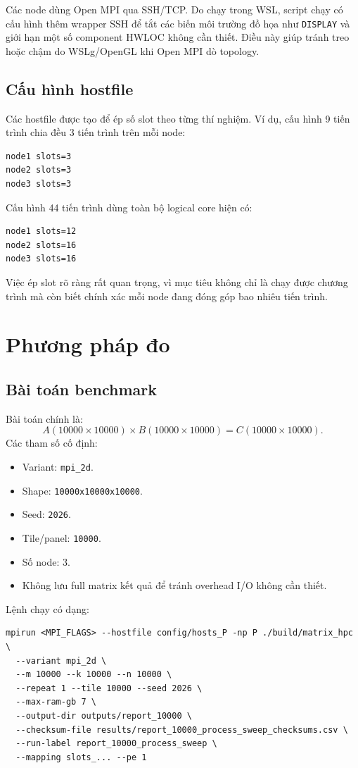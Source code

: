 \documentclass[12pt,a4paper]{article}
\newcommand{\code}[1]{\texttt{#1}}
\newcommand{\shape}{\code{10000x10000x10000}\xspace}
\begin{document}
Các node dùng Open MPI qua SSH/TCP. Do chạy trong WSL, script chạy có cấu hình thêm wrapper SSH để tắt các biến môi trường đồ họa như \code{DISPLAY} và giới hạn một số component HWLOC không cần thiết. Điều này giúp tránh treo hoặc chậm do WSLg/OpenGL khi Open MPI dò topology.

\subsection{Cấu hình hostfile}
Các hostfile được tạo để ép số slot theo từng thí nghiệm. Ví dụ, cấu hình 9 tiến trình chia đều 3 tiến trình trên mỗi node:
\begin{lstlisting}
node1 slots=3
node2 slots=3
node3 slots=3
\end{lstlisting}

Cấu hình 44 tiến trình dùng toàn bộ logical core hiện có:
\begin{lstlisting}
node1 slots=12
node2 slots=16
node3 slots=16
\end{lstlisting}

Việc ép slot rõ ràng rất quan trọng, vì mục tiêu không chỉ là chạy được chương trình mà còn biết chính xác mỗi node đang đóng góp bao nhiêu tiến trình.

\section{Phương pháp đo}
\subsection{Bài toán benchmark}
Bài toán chính là:
\[
  A(10000 \times 10000) \times B(10000 \times 10000) = C(10000 \times 10000).
\]
Các tham số cố định:
\begin{itemize}
  \item Variant: \code{mpi\_2d}.
  \item Shape: \shape.
  \item Seed: \code{2026}.
  \item Tile/panel: \code{10000}.
  \item Số node: 3.
  \item Không lưu full matrix kết quả để tránh overhead I/O không cần thiết.
\end{itemize}

Lệnh chạy có dạng:
\begin{lstlisting}
mpirun <MPI_FLAGS> --hostfile config/hosts_P -np P ./build/matrix_hpc \
  --variant mpi_2d \
  --m 10000 --k 10000 --n 10000 \
  --repeat 1 --tile 10000 --seed 2026 \
  --max-ram-gb 7 \
  --output-dir outputs/report_10000 \
  --checksum-file results/report_10000_process_sweep_checksums.csv \
  --run-label report_10000_process_sweep \
  --mapping slots_... --pe 1
\end{lstlisting}
\end{document}
